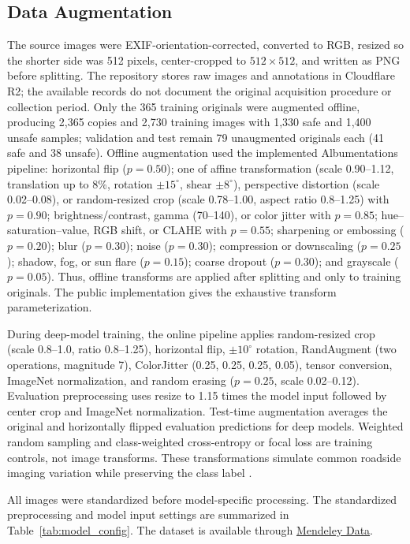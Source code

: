 \documentclass{article}
\begin{document}
\subsection{Data Augmentation}
The source images were EXIF-orientation-corrected, converted to RGB, resized so the shorter side was 512 pixels, center-cropped to $512\times512$, and written as PNG before splitting. The repository stores raw images and annotations in Cloudflare R2; the available records do not document the original acquisition procedure or collection period. Only the 365 training originals were augmented offline, producing 2,365 copies and 2,730 training images with 1,330 safe and 1,400 unsafe samples; validation and test remain 79 unaugmented originals each (41 safe and 38 unsafe). Offline augmentation used the implemented Albumentations pipeline: horizontal flip ($p=0.50$); one of affine transformation (scale 0.90--1.12, translation up to 8\%, rotation $\pm15^\circ$, shear $\pm8^\circ$), perspective distortion (scale 0.02--0.08), or random-resized crop (scale 0.78--1.00, aspect ratio 0.8--1.25) with $p=0.90$; brightness/contrast, gamma (70--140), or color jitter with $p=0.85$; hue--saturation--value, RGB shift, or CLAHE with $p=0.55$; sharpening or embossing ($p=0.20$); blur ($p=0.30$); noise ($p=0.30$); compression or downscaling ($p=0.25$); shadow, fog, or sun flare ($p=0.15$); coarse dropout ($p=0.30$); and grayscale ($p=0.05$). Thus, offline transforms are applied after splitting and only to training originals. The public implementation gives the exhaustive transform parameterization.

During deep-model training, the online pipeline applies random-resized crop (scale 0.8--1.0, ratio 0.8--1.25), horizontal flip, $\pm10^\circ$ rotation, RandAugment (two operations, magnitude 7), ColorJitter (0.25, 0.25, 0.25, 0.05), tensor conversion, ImageNet normalization, and random erasing ($p=0.25$, scale 0.02--0.12). Evaluation preprocessing uses resize to 1.15 times the model input followed by center crop and ImageNet normalization. Test-time augmentation averages the original and horizontally flipped evaluation predictions for deep models. Weighted random sampling and class-weighted cross-entropy or focal loss are training controls, not image transforms. These transformations simulate common roadside imaging variation while preserving the class label \cite{shorten2019augmentation}.

All images were standardized before model-specific processing. The standardized preprocessing and model input settings are summarized in Table~\ref{tab:model_config}. The dataset is available through \href{https://data.mendeley.com/datasets/24n4zpdt69/1}{Mendeley Data}.
\end{document}
